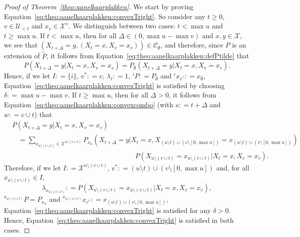 \documentclass[10pt,a4paper]{paper}
\theoremstyle{definition}
\newcommand{\states}{\mathcal{X}}
\newcommand{\coloneqq}{:\!=}
\begin{document}
\begin{proof}[Proof of Theorem~\ref{theo:aanelkaarplakken}]
We start by proving Equation~\eqref{eq:theo:aanelkaarplakken:convexTright}. So consider any $t\geq0$, $v\in\mathcal{U}_{<t}$ and $x_v\in\states^v$.
We distinguish between two cases: $t<\max u$ and $t\geq\max u$. If $t<\max u$, then for all $\Delta\in(0,\max u-\max v)$ and $x,y\in\states$, we see that $(X_{t+\Delta}=y,(X_t=x, X_v=x_v))\in\mathcal{C}_\emptyset$, and therefore, since $P$ is an extension of $\tilde{P}$, it follows from Equation~\eqref{eq:theo:aanelkaarplakken:defPtilde} that
\begin{equation*}
P(X_{t+\Delta}=y\vert X_t=x, X_v=x_v)
=P_\emptyset(X_{t+\Delta}=y\vert X_t=x, X_v=x_v).
\end{equation*}
Hence, if we let $I\coloneqq\{i\}$, $v^*\coloneqq v$, $\lambda_i\coloneqq 1$, ${}^iP\coloneqq P_\emptyset$ and ${}^ix_{v^*}\coloneqq x_\emptyset$, Equation~\eqref{eq:theo:aanelkaarplakken:convexTright} is satisfied by choosing $\delta\coloneqq \max u-\max v$.
If $t\geq \max u$, then for all $\Delta>0$, it follows from Equation~\eqref{eq:theo:aanelkaarplakken:convexcombo} (with $s\coloneqq t+\Delta$ and $w\coloneqq v\cup t$) that
\begin{align*}
&P(X_{t+\Delta}=y\vert X_t=x, X_v=x_v)\\
&~~~~=
\sum_{x_{u\setminus(v\cup t)}\in\states^{u\setminus(v\cup t)}}
P_{x_u}(X_{t+\Delta}=y\vert X_t=x, 
X_{(u\setminus t)\cup(v\setminus [0,\max u])}= 
x_{(u\setminus t)\cup(v\setminus [0,\max u])})\\[-4mm]
&\quad\quad\quad\quad\quad\quad\quad\quad\quad\quad\quad\quad\quad\quad\quad\quad\quad\quad
P(X_{u\setminus(v\cup t)}=x_{u\setminus(v\cup t)}
\vert X_t=x, X_v=x_v).
\end{align*}
Therefore, if we let $I\coloneqq\states^{u\setminus(v\cup t)}$, $v^*\coloneqq (u\setminus t)\cup(v\setminus [0,\max u])$ and, for all $x_{u\setminus(v\cup t)}\in I$,
\begin{equation*}
\lambda_{x_{u\setminus(v\cup t)}}
\coloneqq P(X_{u\setminus(v\cup t)}=x_{u\setminus(v\cup t)}
\vert X_t=x, X_v=x_v),
\end{equation*}
${}^{x_{u\setminus(v\cup t)}}P=P_{x_u}$ and ${}^{x_{u\setminus(v\cup t)}}x_{v^*}\coloneqq
x_{(u\setminus t)\cup(v\setminus [0,\max u])}$, Equation~\eqref{eq:theo:aanelkaarplakken:convexTright} is satisfied for any $\delta>0$.
Hence, Equation~\eqref{eq:theo:aanelkaarplakken:convexTright} is satisfied in both cases.


\end{proof}
\end{document}
